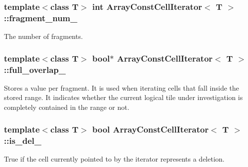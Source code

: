 \subsubsection[{fragment\+\_\+num\+\_\+}]{\setlength{\rightskip}{0pt plus 5cm}template$<$class T$>$ int {\bf Array\+Const\+Cell\+Iterator}$<$ T $>$\+::fragment\+\_\+num\+\_\+\hspace{0.3cm}{\ttfamily [private]}}\label{classArrayConstCellIterator_a4f3c802c4e8f89df32e405d094608776}
The number of fragments. \hypertarget{classArrayConstCellIterator_aa2f4114114b68095a62ce188e846ec3a}{}
\subsubsection[{full\+\_\+overlap\+\_\+}]{\setlength{\rightskip}{0pt plus 5cm}template$<$class T$>$ bool$\ast$ {\bf Array\+Const\+Cell\+Iterator}$<$ T $>$\+::full\+\_\+overlap\+\_\+\hspace{0.3cm}{\ttfamily [private]}}\label{classArrayConstCellIterator_aa2f4114114b68095a62ce188e846ec3a}
Stores a value per fragment. It is used when iterating cells that fall inside the stored range. It indicates whether the current logical tile under investigation is completely contained in the range or not. \hypertarget{classArrayConstCellIterator_a79c74d5f2f04aa9bfd1d2106c8ea4fca}{}
\subsubsection[{is\+\_\+del\+\_\+}]{\setlength{\rightskip}{0pt plus 5cm}template$<$class T$>$ bool {\bf Array\+Const\+Cell\+Iterator}$<$ T $>$\+::is\+\_\+del\+\_\+\hspace{0.3cm}{\ttfamily [private]}}\label{classArrayConstCellIterator_a79c74d5f2f04aa9bfd1d2106c8ea4fca}
True if the cell currently pointed to by the iterator represents a deletion. \hypertarget{classArrayConstCellIterator_a56c781c94e0b17ed78d07280e6ea9752}{}
